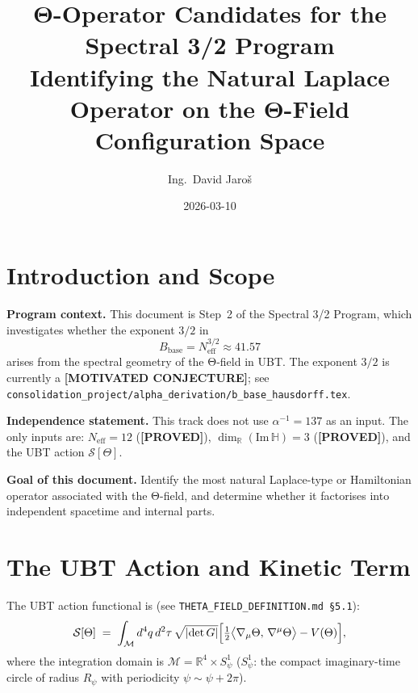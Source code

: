 \documentclass[11pt,a4paper]{article}
\title{Θ-Operator Candidates for the Spectral 3/2 Program\\
    \large Identifying the Natural Laplace Operator on the Θ-Field Configuration Space}
\author{Ing.\ David Jaroš}
\date{2026-03-10}
\theoremstyle{definition}
\theoremstyle{remark}
\begin{document}
  \maketitle
\fi

\section{Introduction and Scope}
\label{sec:intro}

\textbf{Program context.}
This document is Step~2 of the Spectral 3/2 Program, which investigates
whether the exponent $3/2$ in
\begin{equation}
  B_{\mathrm{base}} = N_{\mathrm{eff}}^{3/2} \approx 41.57
  \label{eq:B_conj}
\end{equation}
arises from the spectral geometry of the Θ-field in UBT.
The exponent $3/2$ is currently a \textbf{[MOTIVATED CONJECTURE]};
see \texttt{consolidation\_project/alpha\_derivation/b\_base\_hausdorff.tex}.

\textbf{Independence statement.}
This track does not use $\alpha^{-1} = 137$ as an input.
The only inputs are: $N_{\mathrm{eff}} = 12$ (\textbf{[PROVED]}),
$\dim_\mathbb{R}(\mathrm{Im}\,\mathbb{H}) = 3$ (\textbf{[PROVED]}),
and the UBT action $\mathcal{S}[\Theta]$.

\textbf{Goal of this document.}
Identify the most natural Laplace-type or Hamiltonian operator associated
with the Θ-field, and determine whether it factorises into independent
spacetime and internal parts.

\section{The UBT Action and Kinetic Term}
\label{sec:action}

The UBT action functional is (see \texttt{THETA\_FIELD\_DEFINITION.md §5.1}):
\begin{equation}
  \mathcal{S}[\Theta]
  \;=\; \int_{\mathcal{M}} d^4q\, d^2\tau\, \sqrt{|\!\det G|}
    \Bigl[
      \tfrac{1}{2}\bigl\langle \nabla_\mu \Theta,\, \nabla^\mu \Theta \bigr\rangle
      - V(\Theta)
    \Bigr],
  \label{eq:S_full}
\end{equation}
where the integration domain is $\mathcal{M} = \mathbb{R}^4 \times S^1_\psi$
($S^1_\psi$: the compact imaginary-time circle of radius $R_\psi$ with
periodicity $\psi \sim \psi + 2\pi$).
\end{document}
